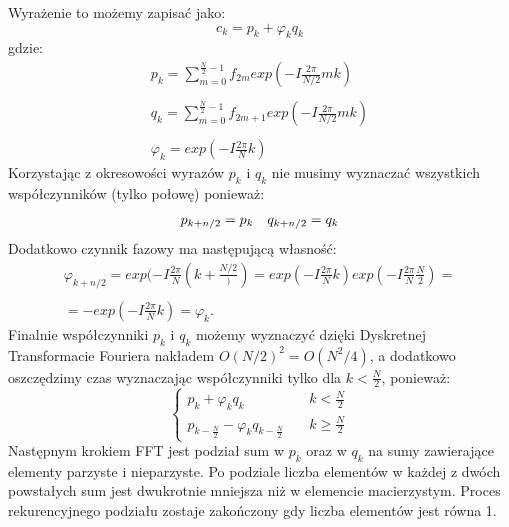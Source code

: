 \documentclass{article}
\begin{document}
Wyrażenie to możemy zapisać jako:
\begin{equation}
c_k = p_k + \varphi_k q_k
\end{equation}
gdzie:
\begin{equation}
\begin{array}{c}
p_k = \displaystyle \sum_{m = 0}^{\frac{N}{2}-1} f_{2m} exp(-I \frac{2\pi}{N/2}mk) \\ \\
q_k = \displaystyle \sum_{m = 0}^{\frac{N}{2}-1} f_{2m+1} exp(-I \frac{2\pi}{N/2}mk)\\ \\
\varphi_k = exp(-I \frac{2\pi}{N}k)
\end{array}
\end{equation}
Korzystając z okresowości wyrazów $p_k$ i $q_k$ nie musimy wyznaczać wszystkich współczynników (tylko połowę) ponieważ:
\begin{equation}
\begin{array}{c c}
p_{k+n/2} = p_k & q_{k+n/2} = q_k
\end{array}
\end{equation}
Dodatkowo czynnik fazowy ma następującą własność:
\begin{equation}
\begin{array}{c}
\varphi_{k + n/2} = exp(-I \frac{2\pi}{N} (k + \frac{N/2})) = exp(-I \frac{2\pi}{N}k) exp(-I \frac{2\pi}{N}\frac{N}{2}) = \\ \\
= - exp(-I \frac{2\pi}{N}k) = \varphi_k.
\end{array}
\end{equation}
Finalnie współczynniki $p_k$ i $q_k$ możemy wyznaczyć dzięki Dyskretnej Transformacie Fouriera nakładem $O(N/2)^2 = O(N^2/4)$, a dodatkowo oszczędzimy czas wyznaczając współczynniki tylko dla $k < \frac{N}{2}$, ponieważ:
\begin{equation}
\begin{cases}
    p_k + \varphi_k q_k       & \quad k < \frac{N}{2}\\
   p_{k-\frac{N}{2}} - \varphi_k q_{k-\frac{N}{2}}  & \quad k \geq \frac{N}{2}
  \end{cases}
\end{equation}
Następnym krokiem FFT jest podział sum w $p_k$ oraz w $q_k$ na sumy zawierające elementy parzyste i nieparzyste. Po podziale liczba elementów w każdej z dwóch powstałych sum jest dwukrotnie mniejsza niż w elemencie macierzystym. Proces rekurencyjnego podziału zostaje zakończony gdy liczba elementów jest równa 1.
\end{document}
